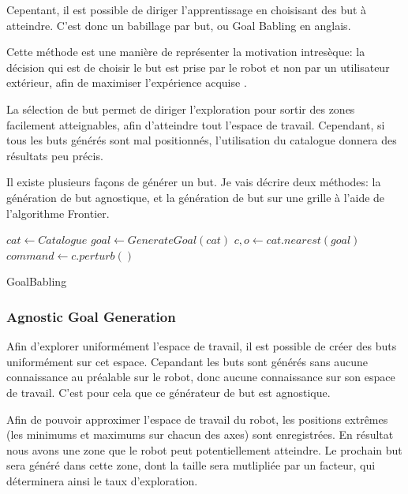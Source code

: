 \documentclass[11pt,french]{report}
\begin{document}
\phantom{INVISIBLE LINE}

Cepentant, il est possible de diriger l'apprentissage en choisisant des but à atteindre.
C'est donc un babillage par but, ou Goal Babling en anglais.

Cette méthode est une manière de représenter la motivation intresèque: la décision qui est de choisir le but est prise par le robot et non par un utilisateur extérieur, afin de maximiser l'expérience acquise \cite{Intrinsic_motivation}.

\phantom{INVISIBLE LINE}

La sélection de but permet de diriger l'exploration pour sortir des zones facilement atteignables, afin d'atteindre tout l'espace de travail.
Cependant, si tous les buts générés sont mal positionnés, l'utilisation du catalogue donnera des résultats peu précis.

Il existe plusieurs façons de générer un but.
Je vais décrire deux méthodes: la génération de but agnostique, et la génération de but sur une grille à l'aide de l'algorithme Frontier.

\begin{algorithm}[h]
    \DontPrintSemicolon
    \LinesNumbered
    $cat \leftarrow Catalogue$\;
    $goal \leftarrow GenerateGoal(cat)$ \;
    $c, o \leftarrow cat.nearest(goal)$ \;
    $command \leftarrow c.perturb()$ \;
    \caption{\label{alg:GoalBabling} GoalBabling}
\end{algorithm}

\subsubsection{Agnostic Goal Generation}

Afin d'explorer uniformément l'espace de travail, il est possible de créer des buts uniformément sur cet espace.
Cepandant les buts sont générés sans aucune connaissance au préalable sur le robot, donc aucune connaissance sur son espace de travail.
C'est pour cela que ce générateur de but est agnostique.

\phantom{INVISIBLE LINE}

Afin de pouvoir approximer l'espace de travail du robot, les positions extrêmes (les minimums et maximums sur chacun des axes) sont enregistrées.
En résultat nous avons une zone que le robot peut potentiellement atteindre.
Le prochain but sera généré dans cette zone, dont la taille sera mutlipliée par un facteur, qui déterminera ainsi le taux d'exploration.
\end{document}
